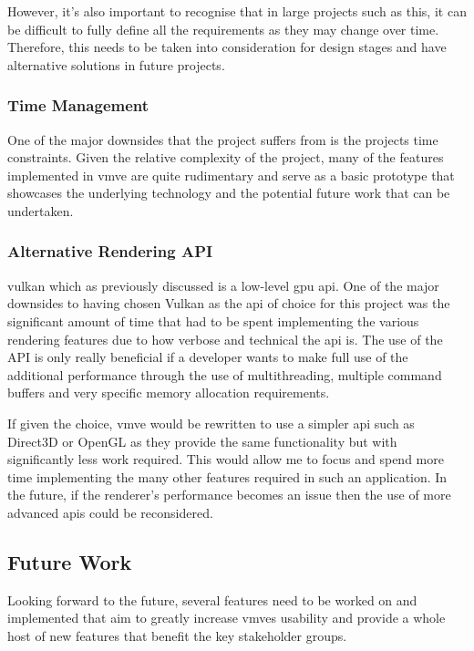 \documentclass[11pt]{article}
\begin{document}
However, it's also important to recognise that in large projects such as this,
it can be difficult to fully define all the requirements as they may change over
time. Therefore, this needs to be taken into consideration for design stages and
have alternative solutions in future projects.

\subsubsection{Time Management}
One of the major downsides that the project suffers from is the projects time
constraints. Given the relative complexity of the project, many of the features
implemented in \gls*{vmve} are quite rudimentary and serve as a basic prototype
that showcases the underlying technology and the potential future work that can
be undertaken.

\subsubsection{Alternative Rendering API}
\gls*{vulkan} which as previously discussed is a low-level \gls*{gpu}
\gls*{api}. One of the major downsides to having chosen Vulkan as the \gls*{api}
of choice for this project was the significant amount of time that had to be
spent implementing the various rendering features due to how verbose and
technical the \gls*{api} is. The use of the API is only really beneficial if a
developer wants to make full use of the additional performance through the use
of multithreading, multiple command buffers and very specific memory allocation
requirements.

If given the choice, \gls*{vmve} would be rewritten to use a simpler \gls*{api}
such as Direct3D or OpenGL as they provide the same functionality but with
significantly less work required. This would allow me to focus and spend more
time implementing the many other features required in such an application. In
the future, if the renderer's performance becomes an issue then the use of more
advanced \glspl*{api} could be reconsidered.


\subsection{Future Work} \label{future_work} 
Looking forward to the future, several features need to be worked on and
implemented that aim to greatly increase \glspl*{vmve} usability and provide a
whole host of new features that benefit the key stakeholder groups.
\end{document}
